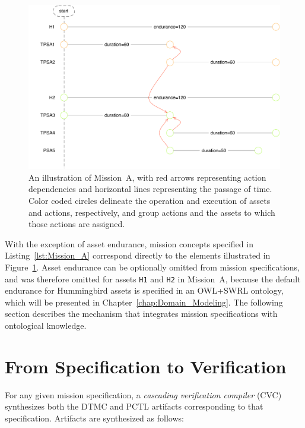 \begin{figure}[ht]
\centering
\includegraphics[scale=0.58]{img/example-mission.pdf}
\caption[A UAV mission example]{An illustration of Mission~A, with red arrows representing action dependencies and horizontal lines representing the passage of time. Color coded circles delineate the operation and execution of assets and actions, respectively, and group actions and the assets to which those actions are assigned.}
\label{fig:example_mission}
\end{figure}

With the exception of asset endurance, mission concepts specified in Listing~\ref{lst:Mission_A} correspond directly to the elements illustrated in Figure~\ref{fig:example_mission}. Asset endurance can be optionally omitted from mission specifications, and was therefore omitted for assets \texttt{H1} and \texttt{H2} in Mission~A, because the default endurance for Hummingbird assets is specified in an OWL+SWRL ontology, which will be presented in Chapter~\ref{chap:Domain_Modeling}. The following section describes the mechanism that integrates mission specifications with ontological knowledge.

\section{From Specification to Verification}
\label{sec:From_Specification_to_Verification}

For any given mission specification, a \emph{cascading verification compiler} (CVC) synthesizes both the DTMC and PCTL artifacts corresponding to that specification. Artifacts are synthesized as follows:

